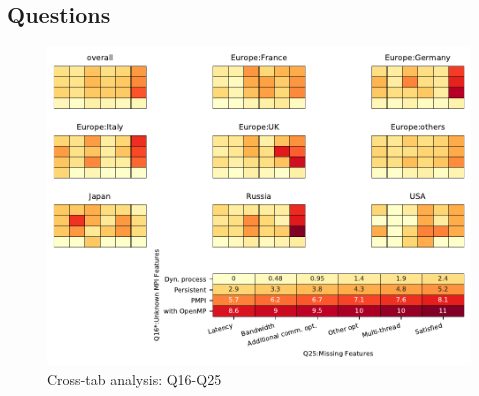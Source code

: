 
\subsection{Questions}


\begin{figure}
\begin{center}
\includegraphics[width=12cm]{../pdfs/Q16-Q25.pdf}
\caption{Cross-tab analysis: Q16-Q25}
\label{fig:Q16-Q25}
\end{center}
\end{figure}
